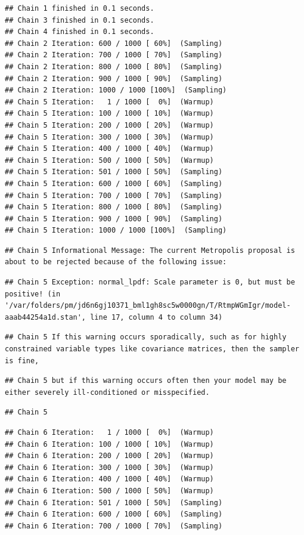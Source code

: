 \documentclass[
]{book}
\begin{document}
\begin{verbatim}
## Chain 1 finished in 0.1 seconds.
## Chain 3 finished in 0.1 seconds.
## Chain 4 finished in 0.1 seconds.
## Chain 2 Iteration: 600 / 1000 [ 60%]  (Sampling) 
## Chain 2 Iteration: 700 / 1000 [ 70%]  (Sampling) 
## Chain 2 Iteration: 800 / 1000 [ 80%]  (Sampling) 
## Chain 2 Iteration: 900 / 1000 [ 90%]  (Sampling) 
## Chain 2 Iteration: 1000 / 1000 [100%]  (Sampling) 
## Chain 5 Iteration:   1 / 1000 [  0%]  (Warmup) 
## Chain 5 Iteration: 100 / 1000 [ 10%]  (Warmup) 
## Chain 5 Iteration: 200 / 1000 [ 20%]  (Warmup) 
## Chain 5 Iteration: 300 / 1000 [ 30%]  (Warmup) 
## Chain 5 Iteration: 400 / 1000 [ 40%]  (Warmup) 
## Chain 5 Iteration: 500 / 1000 [ 50%]  (Warmup) 
## Chain 5 Iteration: 501 / 1000 [ 50%]  (Sampling) 
## Chain 5 Iteration: 600 / 1000 [ 60%]  (Sampling) 
## Chain 5 Iteration: 700 / 1000 [ 70%]  (Sampling) 
## Chain 5 Iteration: 800 / 1000 [ 80%]  (Sampling) 
## Chain 5 Iteration: 900 / 1000 [ 90%]  (Sampling) 
## Chain 5 Iteration: 1000 / 1000 [100%]  (Sampling)
\end{verbatim}

\begin{verbatim}
## Chain 5 Informational Message: The current Metropolis proposal is about to be rejected because of the following issue:
\end{verbatim}

\begin{verbatim}
## Chain 5 Exception: normal_lpdf: Scale parameter is 0, but must be positive! (in '/var/folders/pm/jd6n6gj10371_bml1gh8sc5w0000gn/T/RtmpWGmIgr/model-aaab44254a1d.stan', line 17, column 4 to column 34)
\end{verbatim}

\begin{verbatim}
## Chain 5 If this warning occurs sporadically, such as for highly constrained variable types like covariance matrices, then the sampler is fine,
\end{verbatim}

\begin{verbatim}
## Chain 5 but if this warning occurs often then your model may be either severely ill-conditioned or misspecified.
\end{verbatim}

\begin{verbatim}
## Chain 5
\end{verbatim}

\begin{verbatim}
## Chain 6 Iteration:   1 / 1000 [  0%]  (Warmup) 
## Chain 6 Iteration: 100 / 1000 [ 10%]  (Warmup) 
## Chain 6 Iteration: 200 / 1000 [ 20%]  (Warmup) 
## Chain 6 Iteration: 300 / 1000 [ 30%]  (Warmup) 
## Chain 6 Iteration: 400 / 1000 [ 40%]  (Warmup) 
## Chain 6 Iteration: 500 / 1000 [ 50%]  (Warmup) 
## Chain 6 Iteration: 501 / 1000 [ 50%]  (Sampling) 
## Chain 6 Iteration: 600 / 1000 [ 60%]  (Sampling) 
## Chain 6 Iteration: 700 / 1000 [ 70%]  (Sampling)
\end{verbatim}
\end{document}
